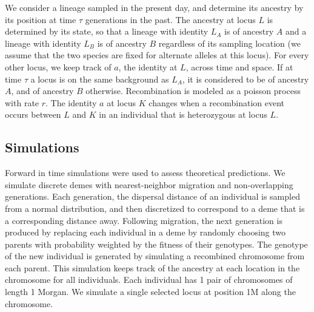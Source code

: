 \documentclass[12pt]{article}
\begin{document}
We consider a lineage sampled in the present day, and determine its ancestry by its position at time $\tau$ generations in the past. The ancestry at locus $L$ is determined by its state, so that a lineage with identity $L_A$ is of ancestry $A$ and a lineage with identity $L_B$ is of ancestry $B$ regardless of its sampling location (we assume that the two species are fixed for alternate alleles at this locus). For every other locus, we keep track of $a$, the identity at $L$, across time and space. If at time $\tau$ a locus is on the same background as $L_A$, it is considered to be of ancestry $A$, and of ancestry $B$ otherwise. Recombination is modeled as a poisson process with rate $r$. The identity $a$ at locus $K$ changes when a recombination event occurs between $L$ and $K$ in an individual that is heterozygous at locus $L$. 
\\



\subsection{}

\subsection{Simulations}
Forward in time simulations were used to assess theoretical predictions. We simulate discrete demes with nearest-neighbor migration and non-overlapping generations. Each generation, the dispersal distance of an individual is sampled from a normal distribution, and then discretized to correspond to a deme that is a corresponding distance away. Following migration, the next generation is produced by replacing each individual in a deme by randomly choosing two parents with probability weighted by the fitness of their genotypes. The genotype of the new individual is generated by simulating a recombined chromosome from each parent. This simulation keeps track of the ancestry at each location in the chromosome for all individuals. Each individual has 1 pair of chromosomes of length 1 Morgan. We simulate a single selected locus at position 1M along the chromosome.
\end{document}

